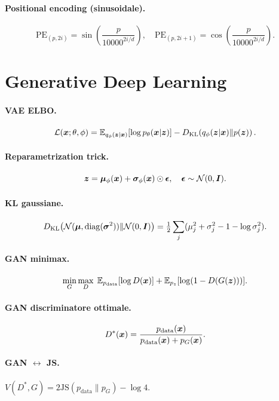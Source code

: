 \paragraph{Positional encoding (sinusoidale).}
\[
\mathrm{PE}_{(p, 2i)} = \sin\!\left(\frac{p}{10000^{2i/d}}\right), \quad \mathrm{PE}_{(p, 2i+1)} = \cos\!\left(\frac{p}{10000^{2i/d}}\right).
\]

\section{Generative Deep Learning}

\paragraph{VAE ELBO.}
\[
\mathcal{L}(\bm{x};\theta,\phi) = \mathbb{E}_{q_\phi(\bm{z}|\bm{x})}[\log p_\theta(\bm{x}|\bm{z})] - D_{\mathrm{KL}}\!\left(q_\phi(\bm{z}|\bm{x}) \| p(\bm{z})\right).
\]

\paragraph{Reparametrization trick.}
\[
\bm{z} = \boldsymbol{\mu}_\phi(\bm{x}) + \boldsymbol{\sigma}_\phi(\bm{x}) \odot \boldsymbol{\epsilon}, \quad \boldsymbol{\epsilon} \sim \mathcal{N}(0, \bm{I}).
\]

\paragraph{KL gaussiane.}
\[
D_{\mathrm{KL}}\!\left(\mathcal{N}(\boldsymbol{\mu}, \mathrm{diag}(\boldsymbol{\sigma}^2)) \| \mathcal{N}(0,\bm{I})\right) = \tfrac{1}{2}\sum_j (\mu_j^2 + \sigma_j^2 - 1 - \log \sigma_j^2).
\]

\paragraph{GAN minimax.}
\[
\min_G \max_D \; \mathbb{E}_{p_{\text{data}}}[\log D(\bm{x})] + \mathbb{E}_{p_z}[\log(1-D(G(\bm{z})))].
\]

\paragraph{GAN discriminatore ottimale.}
\[
D^*(\bm{x}) = \frac{p_{\text{data}}(\bm{x})}{p_{\text{data}}(\bm{x}) + p_G(\bm{x})}.
\]

\paragraph{GAN $\leftrightarrow$ JS.} $V(D^*, G) = 2 \mathrm{JS}(p_{\text{data}} \| p_G) - \log 4$.

